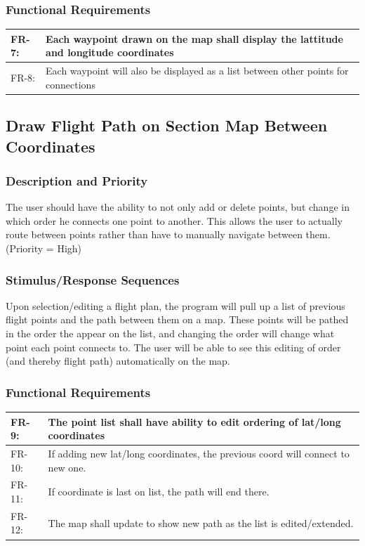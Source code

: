 \documentclass[12pt, letterpaper]{article}
\begin{document}
      \subsubsection{Functional Requirements}
      \begin{tabularx}{\textwidth}{|l|X|} \hline
        FR-7: & Each waypoint drawn on the map shall display the lattitude and longitude coordinates\\ \hline
        FR-8: & Each waypoint will also be displayed as a list between other points for connections\\ \hline
        \end{tabularx}


      \subsection{Draw Flight Path on Section Map Between Coordinates}
        \subsubsection{Description and Priority}
        		The user should have the ability to not only add or delete points, but change in which
        		order he connects one point to another. This allows the user to actually route between 
        		points rather than have to manually navigate between them. (Priority = High)
        \subsubsection{Stimulus/Response Sequences}
            Upon selection/editing a flight plan, the program will pull up a list of previous flight
            points and the path between them on a map. These points will be pathed in the order the
            appear on the list, and changing the order will change what point each point connects to.
            The user will be able to see this editing of order (and thereby flight path) automatically
            on the map.
        \subsubsection{Functional Requirements}
          \begin{tabularx}{\textwidth}{|l|X|} \hline
            FR-9: & The point list shall have ability to edit ordering of lat/long coordinates\\ \hline
            FR-10: & If adding new lat/long coordinates, the previous coord will connect to new one.\\ \hline
            FR-11: & If coordinate is last on list, the path will end there.\\ \hline
      	    FR-12: & The map shall update to show new path as the list is edited/extended.\\ \hline
          \end{tabularx}
\end{document}
